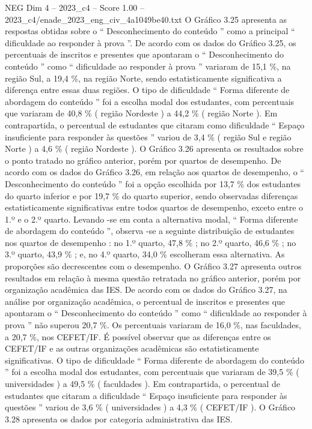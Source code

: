 \begin{textsample}{NEG Dim 4 – 2023\_c4 – Score 1.00 – 2023\_c4/enade\_2023\_eng\_civ\_4a1049be40.txt}
O Gráfico 3.25 apresenta as respostas obtidas sobre o “ Desconhecimento do conteúdo ” como a principal “ dificuldade ao responder à prova ”.
De acordo com os dados do Gráfico 3.25, os percentuais de inscritos e presentes que apontaram o “ Desconhecimento do conteúdo ” como “ dificuldade ao responder à prova ” variaram de 15,1 \%, na região Sul, a 19,4 \%, na região Norte, sendo estatisticamente significativa a diferença entre essas duas regiões.
O tipo de dificuldade “ Forma diferente de abordagem do conteúdo ” foi a escolha modal dos estudantes, com percentuais que variaram de 40,8 \% ( região Nordeste ) a 44,2 \% ( região Norte ).
Em contrapartida, o percentual de estudantes que citaram como dificuldade “ Espaço insuficiente para responder às questões ” variou de 3,4 \% ( região Sul e região Norte ) a 4,6 \% ( região Nordeste ).
O Gráfico 3.26 apresenta os resultados sobre o ponto tratado no gráfico anterior, porém por quartos de desempenho.
De acordo com os dados do Gráfico 3.26, em relação aos quartos de desempenho, o “ Desconhecimento do conteúdo ” foi a opção escolhida por 13,7 \% dos estudantes do quarto inferior e por 19,7 \% do quarto superior, sendo observadas diferenças estatisticamente significativas entre todos quartos de desempenho, exceto entre o 1.º e o 2.º quarto.
Levando -se em conta a alternativa modal, “ Forma diferente de abordagem do conteúdo ”, observa -se a seguinte distribuição de estudantes nos quartos de desempenho : no 1.º quarto, 47,8 \% ; no 2.º quarto, 46,6 \% ; no 3.º quarto, 43,9 \% ; e, no 4.º quarto, 34,0 \% escolheram essa alternativa.
As proporções são decrescentes com o desempenho.
O Gráfico 3.27 apresenta outros resultados em relação à mesma questão retratada no gráfico anterior, porém por organização acadêmica das IES.
De acordo com os dados do Gráfico 3.27, na análise por organização acadêmica, o percentual de inscritos e presentes que apontaram o “ Desconhecimento do conteúdo ” como “ dificuldade ao responder à prova ” não superou 20,7 \%.
Os percentuais variaram de 16,0 \%, nas faculdades, a 20,7 \%, nos CEFET/IF.
É possível observar que as diferenças entre os CEFET/IF e as outras organizações acadêmicas são estatisticamente significativas.
O tipo de dificuldade “ Forma diferente de abordagem do conteúdo ” foi a escolha modal dos estudantes, com percentuais que variaram de 39,5 \% ( universidades ) a 49,5 \% ( faculdades ).
Em contrapartida, o percentual de estudantes que citaram a dificuldade “ Espaço insuficiente para responder às questões ” variou de 3,6 \% ( universidades ) a 4,3 \% ( CEFET/IF ).
O Gráfico 3.28 apresenta os dados por categoria administrativa das IES.

\end{textsample}
